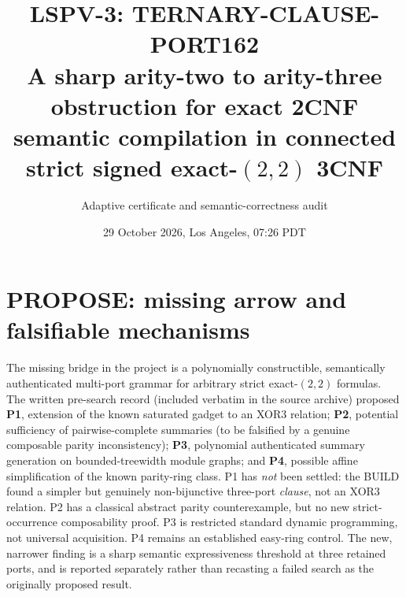 \documentclass[11pt]{article}
\title{LSPV-3: TERNARY-CLAUSE-PORT162\\[3pt]
\large A sharp arity-two to arity-three obstruction for exact 2CNF semantic compilation in connected strict signed exact-$(2,2)$ 3CNF}
\author{Adaptive certificate and semantic-correctness audit}
\date{29 October 2026, Los Angeles, 07:26 PDT}
\begin{document}
\maketitle
\begin{center}\end{center}

\section{PROPOSE: missing arrow and falsifiable mechanisms}
The missing bridge in the project is a polynomially constructible, semantically authenticated multi-port grammar for arbitrary strict exact-$(2,2)$ formulas. The written pre-search record (included verbatim in the source archive) proposed \textbf{P1}, extension of the known saturated gadget to an XOR3 relation; \textbf{P2}, potential sufficiency of pairwise-complete summaries (to be falsified by a genuine composable parity inconsistency); \textbf{P3}, polynomial authenticated summary generation on bounded-treewidth module graphs; and \textbf{P4}, possible affine simplification of the known parity-ring class. P1 has \emph{not} been settled: the BUILD found a simpler but genuinely non-bijunctive three-port \emph{clause}, not an XOR3 relation. P2 has a classical abstract parity counterexample, but no new strict-occurrence composability proof. P3 is restricted standard dynamic programming, not universal acquisition. P4 remains an established easy-ring control. The new, narrower finding is a sharp semantic expressiveness threshold at three retained ports, and is reported separately rather than recasting a failed search as the originally proposed result.
\end{document}
